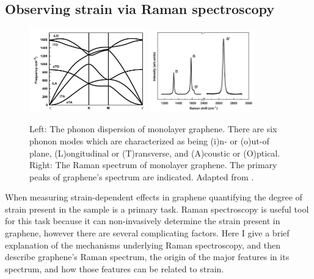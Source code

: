 \documentclass[edeposit,fullpage,draftthesis]{uiucthesis2009}
\begin{document}
        \subsection{Observing strain via Raman spectroscopy}
        \label{sec:bg:raman}
        
            \begin{figure}
            \centering
            \includegraphics[width=0.45\textwidth]{images/background/graphene_phonons.png}
            \includegraphics[width=0.41\textwidth]{images/background/graphene_raman2.png}
            \caption[Phonon dispersion and Raman spectrum of monolayer graphene]{
            Left: The phonon dispersion of monolayer graphene. There are six phonon modes which
            are characterized as being (i)n- or (o)ut-of plane, (L)ongitudinal or (T)ransverse,
            and (A)coustic or (O)ptical.
            Right: The Raman spectrum of monolayer graphene. The primary peaks of graphene's spectrum are indicated.
            Adapted from \cite{malard2009raman}.
            }
            \label{fig:graphene_raman}
            \end{figure}
       
        When measuring strain-dependent effects in graphene quantifying the degree of strain present in 
        the sample is a primary task. Raman spectroscopy is useful tool for this task because it can
        non-invasively determine the strain present in graphene, however there are several complicating factors.
        Here I give a brief explanation of the mechanisms underlying Raman spectroscopy, and then
        describe graphene's Raman spectrum, the origin of the major features in its spectrum,
        and how those features can be related to strain.
        
\end{document}
